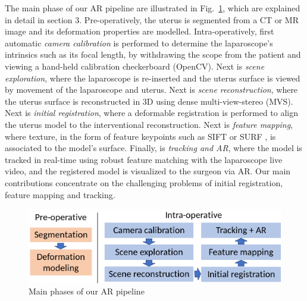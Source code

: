 The main phase of our AR pipeline are illustrated in Fig.~\ref{fig:processOverview}, which are explained in detail in section 3. Pre-operatively, the uterus is segmented from a CT or MR image and its deformation properties are modelled. Intra-operatively, first automatic \emph{camera calibration} is performed to determine the laparoscope's intrinsics such as its focal length, by withdrawing the scope from the patient and viewing a hand-held calibration checkerboard (OpenCV). Next is \emph{scene exploration}, where the laparoscope is re-inserted and the uterus surface is viewed by movement of the laparoscope and uterus. Next is \emph{scene reconstruction}, where the uterus surface is reconstructed in 3D using dense multi-view-stereo (MVS). Next is \emph{initial registration}, where a deformable registration is performed to align the uterus model to the interventional reconstruction. Next is \emph{feature mapping}, where texture, in the form of feature keypoints such as SIFT \cite{Lowe:2004:DIF:993451.996342} or SURF \cite{SURF}, is associated to the model's surface. Finally, is \emph{tracking and AR}, where the model is tracked in real-time using robust feature matching with the laparoscope live video, and the registered model is visualized to the surgeon via AR. Our main contributions concentrate on the challenging problems of initial registration, feature mapping and tracking. 

\begin{figure}[t]
	\centering
	\includegraphics[width=0.8\columnwidth]{./figs/overview.png}
	\caption{Main phases of our AR pipeline}
	\label{fig:processOverview}
\end{figure}




